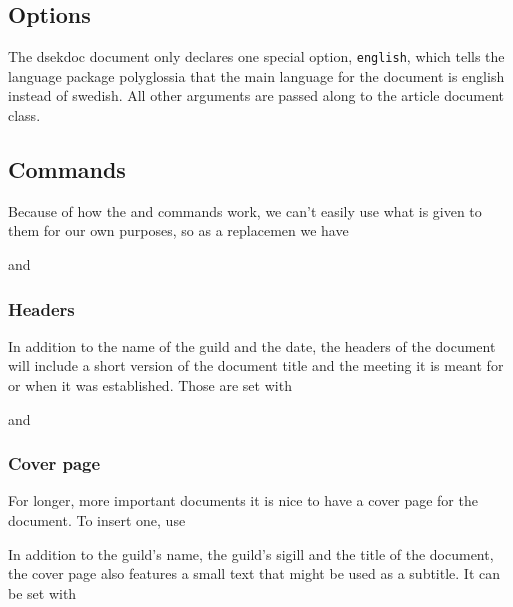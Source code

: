 \documentclass[a4paper, oneside]{ltxdoc}
\begin{document}
\subsection{Options}
The \textsf{dsekdoc} document only declares one special option,
\texttt{english}, which tells the language package \textsf{polyglossia} that the
main language for the document is english instead of swedish.  All other
arguments are passed along to the \textsf{article} document class.

\subsection{Commands}
Because of how the  and  commands work, we can't easily use
what is given to them for our own purposes, so as a replacemen we have
\begin{center}
   and 
\end{center}

\subsubsection{Headers}
In addition to the name of the guild and the date, the headers of the document
will include a short version of the document title and the meeting it is meant
for or when it was established.  Those are set with

\begin{center}
   and 
\end{center}

\subsubsection{Cover page}
For longer, more important documents it is nice to have a cover page for the
document.  To insert one, use

\begin{center}
\end{center}

In addition to the guild's name, the guild's sigill and the title of the
document, the cover page also features a small text that might be used as a
subtitle.  It can be set with

\begin{center}
\end{center}
\end{document}

